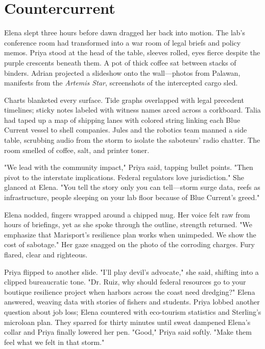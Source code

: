 \chapter{Countercurrent}

Elena slept three hours before dawn dragged her back into motion. The lab's conference room had transformed into a war room of legal briefs and policy memos. Priya stood at the head of the table, sleeves rolled, eyes fierce despite the purple crescents beneath them. A pot of thick coffee sat between stacks of binders. Adrian projected a slideshow onto the wall—photos from Palawan, manifests from the \textit{Artemis Star}, screenshots of the intercepted cargo sled.

Charts blanketed every surface. Tide graphs overlapped with legal precedent timelines; sticky notes labeled with witness names arced across a corkboard. Talia had taped up a map of shipping lanes with colored string linking each Blue Current vessel to shell companies. Jules and the robotics team manned a side table, scrubbing audio from the storm to isolate the saboteurs' radio chatter. The room smelled of coffee, salt, and printer toner.

"We lead with the community impact," Priya said, tapping bullet points. "Then pivot to the interstate implications. Federal regulators love jurisdiction." She glanced at Elena. "You tell the story only you can tell—storm surge data, reefs as infrastructure, people sleeping on your lab floor because of Blue Current's greed."

Elena nodded, fingers wrapped around a chipped mug. Her voice felt raw from hours of briefings, yet as she spoke through the outline, strength returned. "We emphasize that Marisport's resilience plan works when unimpeded. We show the cost of sabotage." Her gaze snagged on the photo of the corroding charges. Fury flared, clear and righteous.

Priya flipped to another slide. "I'll play devil's advocate," she said, shifting into a clipped bureaucratic tone. "Dr. Ruiz, why should federal resources go to your boutique resilience project when harbors across the coast need dredging?" Elena answered, weaving data with stories of fishers and students. Priya lobbed another question about job loss; Elena countered with eco-tourism statistics and Sterling's microloan plan. They sparred for thirty minutes until sweat dampened Elena's collar and Priya finally lowered her pen. "Good," Priya said softly. "Make them feel what we felt in that storm."

